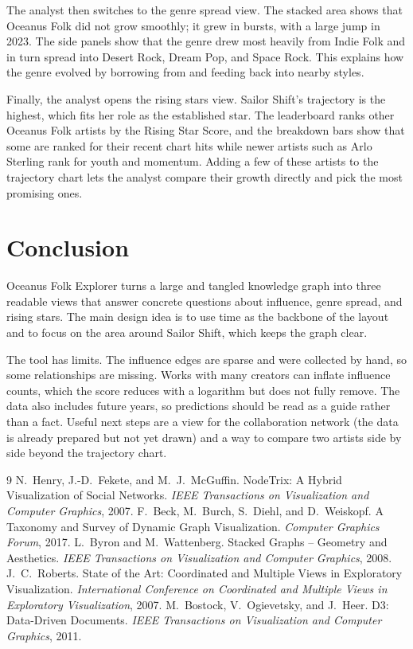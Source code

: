 \documentclass[11pt]{article}
\begin{document}
The analyst then switches to the genre spread view. The stacked area shows that Oceanus
Folk did not grow smoothly; it grew in bursts, with a large jump in 2023. The side panels
show that the genre drew most heavily from Indie Folk and in turn spread into Desert Rock,
Dream Pop, and Space Rock. This explains how the genre evolved by borrowing from and
feeding back into nearby styles.

Finally, the analyst opens the rising stars view. Sailor Shift's trajectory is the highest,
which fits her role as the established star. The leaderboard ranks other Oceanus Folk
artists by the Rising Star Score, and the breakdown bars show that some are ranked for their
recent chart hits while newer artists such as Arlo Sterling rank for youth and momentum.
Adding a few of these artists to the trajectory chart lets the analyst compare their growth
directly and pick the most promising ones.

\section{Conclusion}
Oceanus Folk Explorer turns a large and tangled knowledge graph into three readable views
that answer concrete questions about influence, genre spread, and rising stars. The main
design idea is to use time as the backbone of the layout and to focus on the area around
Sailor Shift, which keeps the graph clear.

The tool has limits. The influence edges are sparse and were collected by hand, so some
relationships are missing. Works with many creators can inflate influence counts, which the
score reduces with a logarithm but does not fully remove. The data also includes future
years, so predictions should be read as a guide rather than a fact. Useful next steps are a
view for the collaboration network (the data is already prepared but not yet drawn) and a
way to compare two artists side by side beyond the trajectory chart.

\begin{thebibliography}{9}
 N.~Henry, J.-D.~Fekete, and M.~J.~McGuffin. NodeTrix: A Hybrid
Visualization of Social Networks. \emph{IEEE Transactions on Visualization and Computer
Graphics}, 2007.
 F.~Beck, M.~Burch, S.~Diehl, and D.~Weiskopf. A Taxonomy and Survey of
Dynamic Graph Visualization. \emph{Computer Graphics Forum}, 2017.
 L.~Byron and M.~Wattenberg. Stacked Graphs -- Geometry and
Aesthetics. \emph{IEEE Transactions on Visualization and Computer Graphics}, 2008.
 J.~C.~Roberts. State of the Art: Coordinated and Multiple Views in
Exploratory Visualization. \emph{International Conference on Coordinated and Multiple Views
in Exploratory Visualization}, 2007.
 M.~Bostock, V.~Ogievetsky, and J.~Heer. D3: Data-Driven Documents.
\emph{IEEE Transactions on Visualization and Computer Graphics}, 2011.
\end{thebibliography}
\end{document}

